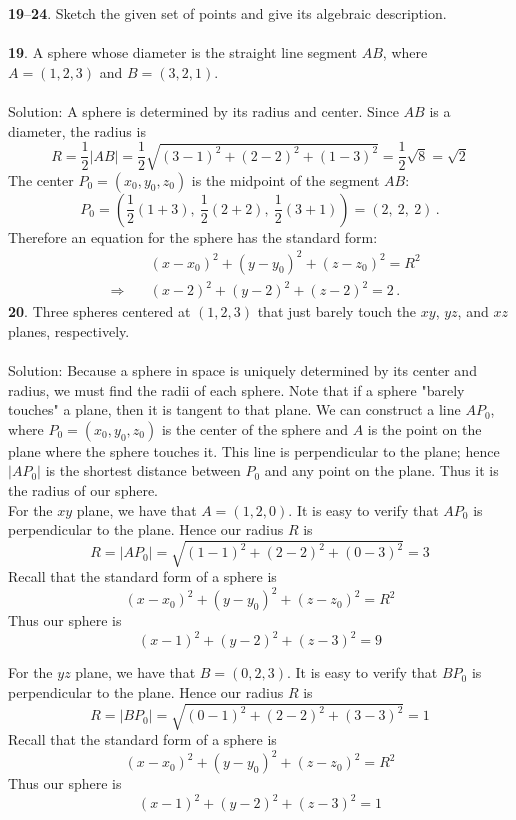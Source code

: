 \documentclass[12pt]{amsbook}
\begin{document}
\noindent
 {\small\bf 19}--{\small\bf 24}. Sketch the given set of points and give its
algebraic description.\\
\\
{\small\bf 19}. A sphere whose diameter is the straight line
segment $AB$, where $A=(1,2,3)$ and $B=(3,2,1)$.\\
\\
{\sc Solution}: A sphere is determined by its radius and center.
Since $AB$ is a diameter, the radius is 
$$
R=\frac 12 |AB|=\frac 12\sqrt{(3-1)^2+(2-2)^2+(1-3)^2}=\frac 12 \sqrt{8}=
\sqrt{2}
$$ 
The center $P_0=(x_0,y_0,z_0)$ is the midpoint of the segment $AB$:
$$
P_0=\left(\frac 12(1+3),\ \frac 12(2+2),\ \frac 12(3+1)\right)=
(2,\ 2,\ 2)\,.
$$ 
Therefore an equation for the sphere has the standard form:
\begin{eqnarray*}
&&\quad (x-x_0)^2+(y-y_0)^2+(z-z_0)^2=R^2\\
&\Rightarrow&\quad
(x-2)^2+(y-2)^2+(z-2)^2=2\,.
\end{eqnarray*}
{\small\bf 20}. Three spheres centered at $(1,2,3)$ that just barely touch
the $xy$, $yz$, and $xz$ planes, respectively. \\
\\
{\sc Solution}:
Because a sphere in space is uniquely determined by its center and radius, we must find the radii of each sphere. Note that if a sphere "barely touches" a plane, then it is tangent to that plane. We can construct a line $AP_0$, where $P_0=(x_0,y_0,z_0)$ is the center of the sphere and $A$ is the point on the plane where the sphere touches it. This line is perpendicular to the plane; hence $|AP_0|$ is the shortest distance between $P_0$ and any point on the plane. Thus it is the radius of our sphere. 
\\
For the $xy$ plane, we have that $A=(1,2,0)$. It is easy to verify that $AP_0$ is perpendicular to the plane. Hence our radius $R$ is
$$
R=|AP_0|=\sqrt{(1-1)^2+(2-2)^2+(0-3)^2}= 3
$$ 
Recall that the standard form of a sphere is
$$
(x-x_0)^2+(y-y_0)^2+(z-z_0)^2=R^2
$$
Thus our sphere is
$$
(x-1)^2+(y-2)^2+(z-3)^2=9
$$

For the $yz$ plane, we have that $B=(0,2,3)$. It is easy to verify that $BP_0$ is perpendicular to the plane. Hence our radius $R$ is
$$
R=|BP_0|=\sqrt{(0-1)^2+(2-2)^2+(3-3)^2}= 1
$$ 
Recall that the standard form of a sphere is
$$
(x-x_0)^2+(y-y_0)^2+(z-z_0)^2=R^2
$$
Thus our sphere is
$$
(x-1)^2+(y-2)^2+(z-3)^2=1
$$
\end{document}
